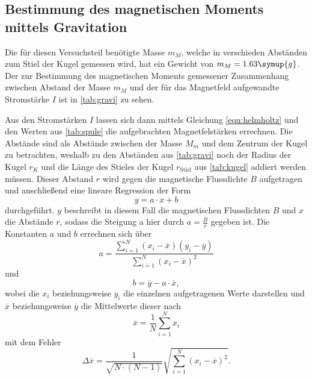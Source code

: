 \subsection{Bestimmung des magnetischen Moments mittels Gravitation}
  Die für diesen Versuchsteil benötigte Masse $m_M$, welche in verschieden Abständen zum Stiel der Kugel gemessen wird, hat ein Gewicht von
  $m_M = 1.63 \symup{g}$. 
  Der zur Bestimmung des magnetischen Moments gemessener Zusammenhang zwischen Abstand der Masse $m_M$ und der für das Magnetfeld
  aufgewandte Stromstärke $I$ ist in \autoref{tab:gravi} zu sehen.
  
  Aus den Stromstärken $I$ lassen sich dann mittels Gleichung \eqref{eqn:helmholtz} und den Werten aus \autoref{tab:spule}
   die aufgebrachten Magnetfelstärken errechnen. Die Abstände sind als 
  Abstände zwischen der Masse $M_m$ und dem Zentrum der Kugel zu betrachten, weshalb zu den Abständen aus \autoref{tab:gravi} 
  noch der Radius der Kugel $r_K$ und die Länge des Stieles der Kugel $r_\text{Stiel}$ aus \autoref{tab:kugel} addiert werden müssen.
  Dieser Abstand $r$ wird gegen die magnetische Flussdichte $B$ aufgetragen und anschließend eine lineare Regression der Form 
  \begin{equation}
  \label{eqn:Gerade}
    y = a \cdot x + b
  \end{equation}
  durchgeführt. $y$ beschreibt in diesem Fall die magnetischen Flussdichten $B$
  und $x$ die Abstände $r$, sodass die Steigung a hier durch $a = \frac{B}{r}$ gegeben ist.
  Die Konstanten $a$ und $b$ errechnen sich über 
  \begin{equation}
    \label{eqn:a}
    a = \frac {\sum_{i=1}^N (x_i - \overline{x}) (y_i - \overline{y})}{\sum_{i=1}^N (x_i - \overline{x})^2}
  \end{equation}
  und
  \begin{equation}
  \label{eqn:b}
  b = \overline{y} - a \cdot \overline{x},
  \end{equation}
  wobei die $x_i$ beziehungsweise $y_i$ die einzelnen aufgetragenen Werte darstellen und $\overline{x}$ beziehungsweise $\overline{y}$
  die Mittelwerte dieser nach
  \begin{equation}
  \label{eqn:mittelwert}
  \overline{x} = \frac {1} {N} \sum_{i=1}^N x_i
  \end{equation}
  mit dem Fehler 
  \begin{equation}
  \label{eqn:FehlerMittelwert}
  \Delta \overline{x} = \frac{1}{\sqrt{N \cdot (N-1)}} \sqrt{ \sum_{i=1}^N (x_i - \overline{x})^2}.
  \end{equation}
